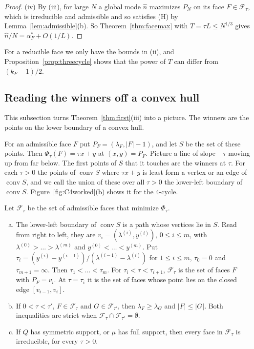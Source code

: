 \begin{proof}
(iv) By (iii), for large $N$ a global mode $\hat n$ maximizes $P_N$ on its face
$F\in\mathcal F_\tau$, which is irreducible and admissible and so satisfies (H) by
Lemma~\ref{lem:admissible}(b). So Theorem~\ref{thm:facemax} with
$T=\tau L\le N^{1/3}$ gives $\hat n/N=\alpha^*_F+O(1/L)$.
\end{proof}

For a reducible face we only have the bounds in (ii), and
Proposition~\ref{prop:threecycle} shows that the power of $T$ can differ from
$(k_F-1)/2$.

\subsection{Reading the winners off a convex hull}

This subsection turns Theorem~\ref{thm:first}(iii) into a picture. The winners are the points
on the lower boundary of a convex hull.

For an admissible face $F$ put $P_F=(\lambda_F,\lvert F\rvert-1)$, and let $S$
be the set of these points. Then $\Phi_\tau(F)=\tau x+y$ at $(x,y)=P_F$. Picture
a line of slope $-\tau$ moving up from far below. The first points of $S$ that
it touches are the winners at $\tau$. For each $\tau>0$ the points of
$\operatorname{conv}S$ where $\tau x+y$ is least form a vertex or an edge of
$\operatorname{conv}S$, and we call the union of these over all $\tau>0$ the
lower-left boundary of $\operatorname{conv}S$. Figure~\ref{fig:C4worked}(b) shows
it for the 4-cycle.

\begin{theorem}\label{thm:hull}
Let $\mathcal F_\tau$ be the set of admissible faces that minimize
$\Phi_\tau$.
\begin{enumerate}[(a)]
\item The lower-left boundary of $\operatorname{conv}S$ is a path whose
vertices lie in $S$. Read from right to left, they are
$v_i=(\lambda^{(i)},y^{(i)})$, $0\le i\le m$, with
$\lambda^{(0)}>\dots>\lambda^{(m)}$ and $y^{(0)}<\dots<y^{(m)}$. Put
$\tau_i=(y^{(i)}-y^{(i-1)})/(\lambda^{(i-1)}-\lambda^{(i)})$ for $1\le i\le m$,
$\tau_0=0$ and $\tau_{m+1}=\infty$. Then $\tau_1<\dots<\tau_m$. For
$\tau_i<\tau<\tau_{i+1}$, $\mathcal F_\tau$ is the set of faces $F$ with
$P_F=v_i$. At $\tau=\tau_i$ it is the set of faces whose point lies on the
closed edge $[v_{i-1},v_i]$.
\item If $0<\tau<\tau'$, $F\in\mathcal F_\tau$ and $G\in\mathcal F_{\tau'}$,
then $\lambda_F\ge\lambda_G$ and $\lvert F\rvert\le\lvert G\rvert$. Both
inequalities are strict when $\mathcal F_\tau\cap\mathcal F_{\tau'}=\emptyset$.
\item If $Q$ has symmetric support, or $\mu$ has full support, then every face
in $\mathcal F_\tau$ is irreducible, for every $\tau>0$.
\end{enumerate}
\end{theorem}

